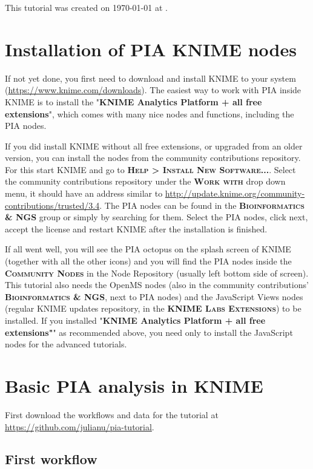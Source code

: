 \documentclass[a4paper,11pt,twoside]{article}
\newcommand{\menu}[1]{{\scshape\bfseries #1}}
\begin{document}
This tutorial was created on \today{} at \currenttime{}.


\newpage
\section{Installation of PIA KNIME nodes}

If not yet done, you first need to download and install KNIME to your system
(\url{https://www.knime.com/downloads}). The easiest way to work with PIA inside
KNIME is to install the "\textbf{KNIME Analytics Platform + all free
extensions}", which comes with many nice nodes and functions, including the PIA
nodes.

If you did install KNIME without all free extensions, or upgraded from an older
version, you can install the nodes from the community contributions repository.
For this start KNIME and go to \menu{Help > Install New Software...}. Select the
community contributions repository under the \menu{Work with} drop down menu, it
should have an address similar to
\url{http://update.knime.org/community-contributions/trusted/3.4}. The PIA nodes
can be found in the \menu{Bioinformatics \& NGS} group or simply by searching
for them. Select the PIA nodes, click next, accept the license and restart KNIME
after the installation is finished.

If all went well, you will see the PIA octopus on the splash screen of KNIME
(together with all the other icons) and you will find the PIA nodes inside the
\menu{Community Nodes} in the Node Repository (usually left bottom side of
screen). This tutorial also needs the OpenMS nodes (also in the community
contributions' \menu{Bioinformatics \& NGS}, next to PIA nodes) and the
JavaScript Views nodes (regular KNIME updates repository, in the \menu{KNIME
Labs Extensions}) to be installed. If you installed "\textbf{KNIME Analytics
Platform + all free extensions"}" as recommended above, you need only to install
the JavaScript nodes for the advanced tutorials.


\newpage
\section{Basic PIA analysis in KNIME}

First download the workflows and data for the tutorial at
\url{https://github.com/julianu/pia-tutorial}.


\subsection{First workflow}
\end{document}
